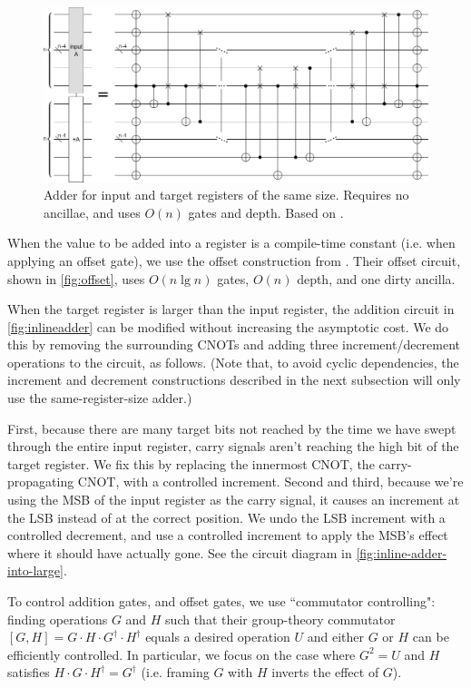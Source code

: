 \documentclass[twocolumn,longbibliography]{quantumarticle}
\begin{document}
\begin{figure}
  \centering
  \includegraphics[width=\linewidth]{assets/inline-adder.png}
  \caption{ Adder for input and target registers of the same size.
  Requires no ancillae, and uses $O(n)$ gates and depth.
  Based on \cite{van2004, takahashi2005}.}
  \label{fig:inlineadder}
\end{figure}

When the value to be added into a register is a compile-time constant (i.e. when applying an offset gate), we use the offset construction from \cite{haner2016}.
Their offset circuit, shown in \autoref{fig:offset}, uses $O(n \lg n)$ gates, $O(n)$ depth, and one dirty ancilla.

When the target register is larger than the input register, the addition circuit in \autoref{fig:inlineadder} can be modified without increasing the asymptotic cost.
We do this by removing the surrounding CNOTs and adding three increment/decrement operations to the circuit, as follows.
(Note that, to avoid cyclic dependencies, the increment and decrement constructions described in the next subsection will only use the same-register-size adder.)

First, because there are many target bits not reached by the time we have swept through the entire input register, carry signals aren't reaching the high bit of the target register.
We fix this by replacing the innermost CNOT, the carry-propagating CNOT, with a controlled increment.
Second and third, because we're using the MSB of the input register as the carry signal, it causes an increment at the LSB instead of at the correct position.
We undo the LSB increment with a controlled decrement, and use a controlled increment to apply the MSB's effect where it should have actually gone.
See the circuit diagram in \autoref{fig:inline-adder-into-large}.

To control addition gates, and offset gates, we use ``commutator controlling": finding operations $G$ and $H$ such that their group-theory commutator $[G, H] = G \cdot H \cdot G^\dagger \cdot H^\dagger$ equals a desired operation $U$ and either $G$ or $H$ can be efficiently controlled.
In particular, we focus on the case where $G^2 = U$ and $H$ satisfies $H \cdot G \cdot H^\dagger = G^\dagger$ (i.e. framing $G$ with $H$ inverts the effect of $G$).
\end{document}
